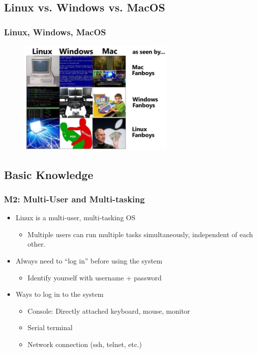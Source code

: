 \documentclass[red]{beamer}
\begin{document}
\begin{CJK*}{UTF8}{gbsn}
\subsection{Linux vs. Windows vs. MacOS}
\begin{frame}
\frametitle{Linux, Windows, MacOS}
\begin{figure}
  \includegraphics[width=3in]{images/comparison2.jpg}
\end{figure}
\end{frame}

\subsection{Basic Knowledge}

\begin{frame}
\frametitle{M2: Multi-User and Multi-tasking}
\begin{itemize}
    \item Linux is a multi-user, multi-tasking OS
    \begin{itemize}
        \item Multiple users can run multiple tasks simultaneously, independent 
			of each other.
    \end{itemize}
    \item Always need to ``log in'' before using the system
    \begin{itemize}
        \item Identify yourself with username + password
    \end{itemize}
    \item Ways to log in to the system
    \begin{itemize}
        \item Console: Directly attached keyboard, mouse, monitor
        \item Serial terminal
        \item Network connection (ssh, telnet, etc.)
    \end{itemize}
\end{itemize}
\end{frame}


\end{CJK*}
\end{document}
